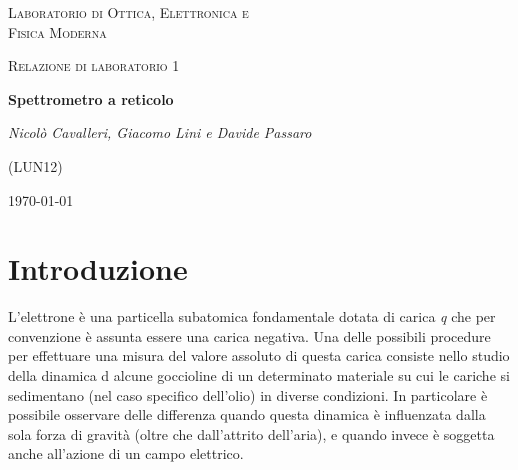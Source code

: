 \documentclass[a4paper,11pt]{article}
\newcommand{\virgolette}[1]{``#1''}
\begin{document}
\begin{titlepage}
	\centering
	{\scshape\LARGE Laboratorio di Ottica, Elettronica e \\ Fisica Moderna \par}
	\vspace{1cm}
	{\scshape\Large Relazione di laboratorio 1\par}
	\vspace{1.5cm}
	{\huge\bfseries Spettrometro a reticolo\par}
	\vspace{2cm}

	{\Large\itshape Nicolò Cavalleri, Giacomo Lini e Davide Passaro
	
	(LUN12)}

	\vspace{5cm}
	\vfill
	\begin{abstract}
	
		Di seguito vengono riportate ed esaminate le procedure compiute per la misura della carica dell'elettrone. Sfruttando un supporto fisico che genera un campo elettrico è infatti possibile osservare la variazione di moto di alcune goccioline di olio che si sono caricate elettricamente per strofinio. Dalla variazione di questo moto -- in termini di velocità di caduta e risalita a seconda del verso del campo elettrico, è poi possibile dedurre la quantità di carica che si è \virgolette{sedimentata} sulle goccioline, individuando cos\'i dei multipli della carica di un singolo elettrone.
	
	\end{abstract}

	\vfill
	{\large \today\par}

\end{titlepage}

\newpage

\section{Introduzione}

L'elettrone è una particella subatomica fondamentale dotata di carica \textit{q} che per convenzione è assunta essere una carica negativa. Una delle possibili procedure per effettuare una misura del valore assoluto di questa carica consiste nello studio della dinamica d alcune goccioline di un determinato materiale su cui le cariche si sedimentano (nel caso specifico dell'olio) in diverse condizioni. In particolare è possibile osservare delle differenza quando questa dinamica è influenzata dalla sola forza di gravità (oltre che dall'attrito dell'aria), e quando invece è soggetta anche all'azione di un campo elettrico. 
\end{document}

